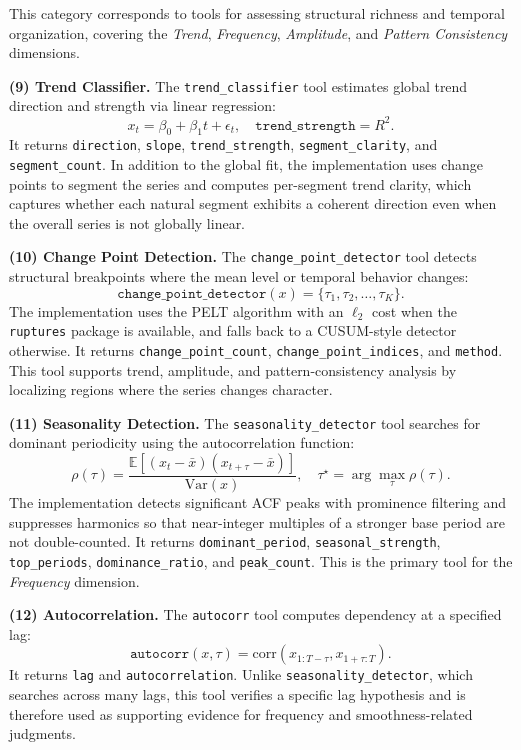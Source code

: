 \documentclass{article}
\begin{document}
This category corresponds to tools for assessing structural richness and temporal organization, covering the \textit{Trend}, \textit{Frequency}, \textit{Amplitude}, and \textit{Pattern Consistency} dimensions.

\textbf{(9) Trend Classifier.}
The \texttt{trend\_classifier} tool estimates global trend direction and strength via linear regression:
\begin{equation}
x_t = \beta_0 + \beta_1 t + \epsilon_t,\quad
\texttt{trend\_strength}=R^2.
\end{equation}
It returns \texttt{direction}, \texttt{slope}, \texttt{trend\_strength}, \texttt{segment\_clarity}, and \texttt{segment\_count}. In addition to the global fit, the implementation uses change points to segment the series and computes per-segment trend clarity, which captures whether each natural segment exhibits a coherent direction even when the overall series is not globally linear.

\textbf{(10) Change Point Detection.}
The \texttt{change\_point\_detector} tool detects structural breakpoints where the mean level or temporal behavior changes:
\begin{equation}
\texttt{change\_point\_detector}(x)=\{\tau_1,\tau_2,\ldots,\tau_K\}.
\end{equation}
The implementation uses the PELT algorithm with an $\ell_2$ cost when the \texttt{ruptures} package is available, and falls back to a CUSUM-style detector otherwise. It returns \texttt{change\_point\_count}, \texttt{change\_point\_indices}, and \texttt{method}. This tool supports trend, amplitude, and pattern-consistency analysis by localizing regions where the series changes character.

\textbf{(11) Seasonality Detection.}
The \texttt{seasonality\_detector} tool searches for dominant periodicity using the autocorrelation function:
\begin{equation}
\rho(\tau)=
\frac{\mathbb{E}[(x_t-\bar{x})(x_{t+\tau}-\bar{x})]}{\mathrm{Var}(x)},\quad
\tau^\star = \arg\max_{\tau} \rho(\tau).
\end{equation}
The implementation detects significant ACF peaks with prominence filtering and suppresses harmonics so that near-integer multiples of a stronger base period are not double-counted. It returns \texttt{dominant\_period}, \texttt{seasonal\_strength}, \texttt{top\_periods}, \texttt{dominance\_ratio}, and \texttt{peak\_count}. This is the primary tool for the \textit{Frequency} dimension.

\textbf{(12) Autocorrelation.}
The \texttt{autocorr} tool computes dependency at a specified lag:
\begin{equation}
\texttt{autocorr}(x,\tau)=\mathrm{corr}(x_{1:T-\tau},x_{1+\tau:T}).
\end{equation}
It returns \texttt{lag} and \texttt{autocorrelation}. Unlike \texttt{seasonality\_detector}, which searches across many lags, this tool verifies a specific lag hypothesis and is therefore used as supporting evidence for frequency and smoothness-related judgments.
\end{document}
